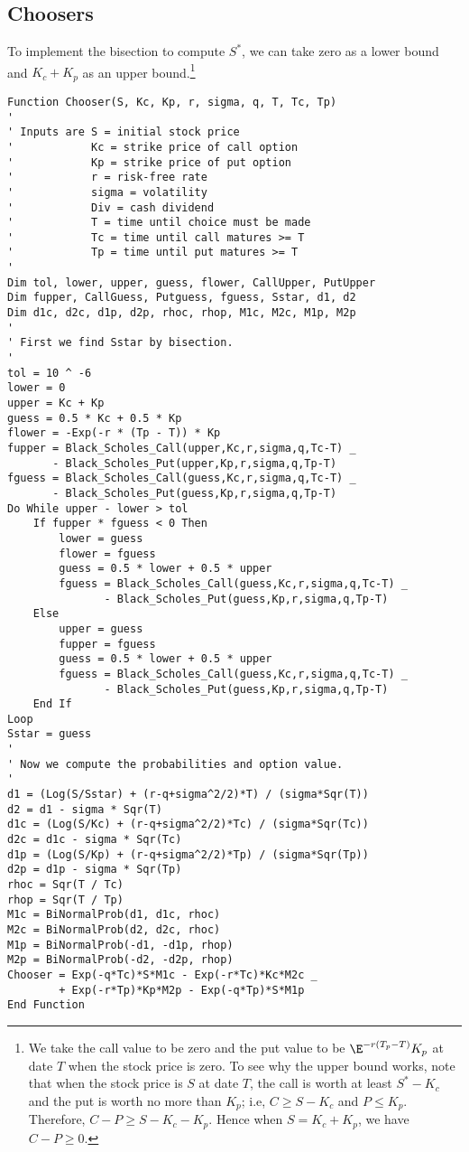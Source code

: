 \subsection*{Choosers}

To implement the bisection to compute $S^*$, we can take zero as a lower bound and $K_c+K_p$ as an upper bound.\footnote{We take the call value to be zero and the put value to be $\E^{-r(T_p-T)}K_p$ at date $T$ when the stock price is zero.  To see why the upper bound works, note that when the stock price is $S$ at date $T$,  the call is worth at least $S^*-K_c$ and the put is worth no more than $K_p$; i.e, $C \geq S-K_c$ and $P \leq K_p$.  Therefore, $C-P \geq S-K_c-K_p$.  Hence when $S=K_c+K_p$, we have $C-P\geq 0$. }
\small\begin{verbatim}
Function Chooser(S, Kc, Kp, r, sigma, q, T, Tc, Tp)
'
' Inputs are S = initial stock price
'            Kc = strike price of call option
'            Kp = strike price of put option
'            r = risk-free rate
'            sigma = volatility
'            Div = cash dividend
'            T = time until choice must be made
'            Tc = time until call matures >= T
'            Tp = time until put matures >= T
'
Dim tol, lower, upper, guess, flower, CallUpper, PutUpper
Dim fupper, CallGuess, Putguess, fguess, Sstar, d1, d2
Dim d1c, d2c, d1p, d2p, rhoc, rhop, M1c, M2c, M1p, M2p
'
' First we find Sstar by bisection.
'
tol = 10 ^ -6
lower = 0
upper = Kc + Kp
guess = 0.5 * Kc + 0.5 * Kp
flower = -Exp(-r * (Tp - T)) * Kp
fupper = Black_Scholes_Call(upper,Kc,r,sigma,q,Tc-T) _
       - Black_Scholes_Put(upper,Kp,r,sigma,q,Tp-T)
fguess = Black_Scholes_Call(guess,Kc,r,sigma,q,Tc-T) _
       - Black_Scholes_Put(guess,Kp,r,sigma,q,Tp-T)
Do While upper - lower > tol
    If fupper * fguess < 0 Then
        lower = guess
        flower = fguess
        guess = 0.5 * lower + 0.5 * upper
        fguess = Black_Scholes_Call(guess,Kc,r,sigma,q,Tc-T) _
               - Black_Scholes_Put(guess,Kp,r,sigma,q,Tp-T)
    Else
        upper = guess
        fupper = fguess
        guess = 0.5 * lower + 0.5 * upper
        fguess = Black_Scholes_Call(guess,Kc,r,sigma,q,Tc-T) _
               - Black_Scholes_Put(guess,Kp,r,sigma,q,Tp-T)
    End If
Loop
Sstar = guess
'
' Now we compute the probabilities and option value.
'
d1 = (Log(S/Sstar) + (r-q+sigma^2/2)*T) / (sigma*Sqr(T))
d2 = d1 - sigma * Sqr(T)
d1c = (Log(S/Kc) + (r-q+sigma^2/2)*Tc) / (sigma*Sqr(Tc))
d2c = d1c - sigma * Sqr(Tc)
d1p = (Log(S/Kp) + (r-q+sigma^2/2)*Tp) / (sigma*Sqr(Tp))
d2p = d1p - sigma * Sqr(Tp)
rhoc = Sqr(T / Tc)
rhop = Sqr(T / Tp)
M1c = BiNormalProb(d1, d1c, rhoc)
M2c = BiNormalProb(d2, d2c, rhoc)
M1p = BiNormalProb(-d1, -d1p, rhop)
M2p = BiNormalProb(-d2, -d2p, rhop)
Chooser = Exp(-q*Tc)*S*M1c - Exp(-r*Tc)*Kc*M2c _
        + Exp(-r*Tp)*Kp*M2p - Exp(-q*Tp)*S*M1p
End Function
\end{verbatim}\normalsize

